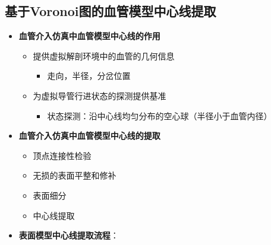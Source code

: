 \subsection[中心线提取]{基于Voronoi图的血管模型中心线提取}

\begin{frame}
\begin{itemize}
\item \textbf{血管介入仿真中血管模型中心线的作用}
\begin{itemize}
\pause \item 提供虚拟解剖环境中的血管的几何信息
\begin{itemize}
\item 走向，半径，分岔位置
\end{itemize}
\pause \item 为虚拟导管行进状态的探测提供基准
\begin{itemize}
\item 状态探测：沿中心线均匀分布的空心球（半径小于血管内径）
\end{itemize}
\end{itemize}
\pause \item \textbf{血管介入仿真中血管模型中心线的提取}
\begin{itemize}
\pause \item 顶点连接性检验
\pause \item 无损的表面平整和修补
\pause \item 表面细分
\pause \item 中心线提取
\end{itemize}
\end{itemize}
\end{frame}

\begin{frame}
\begin{itemize}
  \item \textbf{表面模型中心线提取流程}：
\end{itemize}
\begin{figure}[t]
\centering

\end{figure}
\end{frame}

